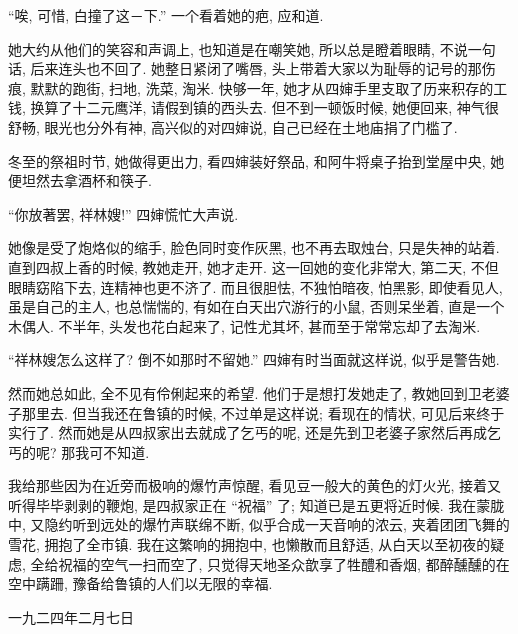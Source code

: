 ``唉, 可惜, 白撞了这－下.''
一个看着她的疤, 应和道.

她大约从他们的笑容和声调上, 也知道是在嘲笑她,
所以总是瞪着眼睛, 不说一句话, 后来连头也不回了.
她整日紧闭了嘴唇, 头上带着大家以为耻辱的记号的那伤痕,
默默的跑街, 扫地, 洗菜, 淘米.
快够一年, 她才从四婶手里支取了历来积存的工钱,
换算了十二元鹰洋, 请假到镇的西头去.
但不到一顿饭时候, 她便回来, 神气很舒畅,
眼光也分外有神, 高兴似的对四婶说, 自己已经在土地庙捐了门槛了.

冬至的祭祖时节, 她做得更出力, 看四婶装好祭品,
和阿牛将桌子抬到堂屋中央, 她便坦然去拿酒杯和筷子.

``你放著罢, 祥林嫂!'' 四婶慌忙大声说.

她像是受了炮烙似的缩手, 脸色同时变作灰黑,
也不再去取烛台, 只是失神的站着.
直到四叔上香的时候, 教她走开, 她才走开.
这一回她的变化非常大,
第二天, 不但眼睛窈陷下去, 连精神也更不济了.
而且很胆怯, 不独怕暗夜, 怕黑影,
即使看见人, 虽是自己的主人, 也总惴惴的,
有如在白天出穴游行的小鼠, 否则呆坐着, 直是一个木偶人.
不半年, 头发也花白起来了, 记性尤其坏, 甚而至于常常忘却了去淘米.

``祥林嫂怎么这样了? 倒不如那时不留她.''
四婶有时当面就这样说, 似乎是警告她.

然而她总如此, 全不见有伶俐起来的希望.
他们于是想打发她走了, 教她回到卫老婆子那里去.
但当我还在鲁镇的时候, 不过单是这样说;
看现在的情状, 可见后来终于实行了.
然而她是从四叔家出去就成了乞丐的呢,
还是先到卫老婆子家然后再成乞丐的呢?
那我可不知道.

我给那些因为在近旁而极响的爆竹声惊醒,
看见豆一般大的黄色的灯火光,
接着又听得毕毕剥剥的鞭炮,
是四叔家正在 ``祝福'' 了;
知道已是五更将近时候.
我在蒙胧中, 又隐约听到远处的爆竹声联绵不断,
似乎合成一天音响的浓云, 夹着团团飞舞的雪花, 拥抱了全市镇.
我在这繁响的拥抱中, 也懒散而且舒适,
从白天以至初夜的疑虑, 全给祝福的空气一扫而空了,
只觉得天地圣众歆享了牲醴和香烟, 都醉醺醺的在空中蹒跚,
豫备给鲁镇的人们以无限的幸福.

\begin{flushright}
    一九二四年二月七日
\end{flushright}
